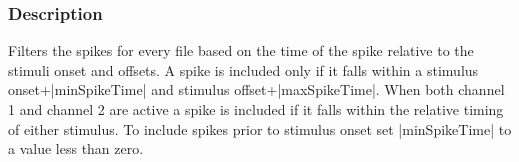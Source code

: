 \documentclass{report}
\begin{document}
\subsubsection{Description}
Filters the spikes for every file based on the time of the spike relative to the stimuli onset and offsets. A spike is included only if it falls within a stimulus onset+|minSpikeTime| and stimulus offset+|maxSpikeTime|. When both channel 1 and channel 2 are active a spike is included if it falls within the relative timing of either stimulus. To include spikes prior to stimulus onset set |minSpikeTime| to a value less than zero.


\subsection{}
\subsection{}
\subsection{}
\subsection{}
\subsection{}
\subsection{}
\subsection{}
\subsection{}
\subsection{}
\end{document}
